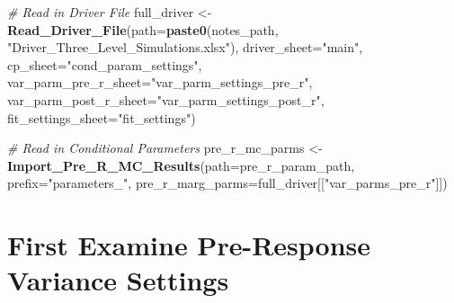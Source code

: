 \documentclass[
]{article}
\newenvironment{Shaded}{\begin{snugshade}}{\end{snugshade}}
\newcommand{\AttributeTok}[1]{\textcolor[rgb]{0.13,0.29,0.53}{#1}}
\newcommand{\CommentTok}[1]{\textcolor[rgb]{0.56,0.35,0.01}{\textit{#1}}}
\newcommand{\FunctionTok}[1]{\textcolor[rgb]{0.13,0.29,0.53}{\textbf{#1}}}
\newcommand{\NormalTok}[1]{#1}
\newcommand{\OtherTok}[1]{\textcolor[rgb]{0.56,0.35,0.01}{#1}}
\newcommand{\StringTok}[1]{\textcolor[rgb]{0.31,0.60,0.02}{#1}}
\begin{document}
\begin{Shaded}
\begin{Highlighting}[]
\CommentTok{\# Read in Driver File}
\NormalTok{full\_driver }\OtherTok{\textless{}{-}} \FunctionTok{Read\_Driver\_File}\NormalTok{(}\AttributeTok{path=}\FunctionTok{paste0}\NormalTok{(notes\_path, }\StringTok{"Driver\_Three\_Level\_Simulations.xlsx"}\NormalTok{), }
                                \AttributeTok{driver\_sheet=}\StringTok{"main"}\NormalTok{, }
                                \AttributeTok{cp\_sheet=}\StringTok{"cond\_param\_settings"}\NormalTok{,}
                                \AttributeTok{var\_parm\_pre\_r\_sheet=}\StringTok{"var\_parm\_settings\_pre\_r"}\NormalTok{,}
                                \AttributeTok{var\_parm\_post\_r\_sheet=}\StringTok{"var\_parm\_settings\_post\_r"}\NormalTok{,}
                                \AttributeTok{fit\_settings\_sheet=}\StringTok{"fit\_settings"}\NormalTok{)}

\CommentTok{\# Read in Conditional Parameters}
\NormalTok{pre\_r\_mc\_parms }\OtherTok{\textless{}{-}} \FunctionTok{Import\_Pre\_R\_MC\_Results}\NormalTok{(}\AttributeTok{path=}\NormalTok{pre\_r\_param\_path, }
                                          \AttributeTok{prefix=}\StringTok{"parameters\_"}\NormalTok{, }
                                          \AttributeTok{pre\_r\_marg\_parms=}\NormalTok{full\_driver[[}\StringTok{"var\_parms\_pre\_r"}\NormalTok{]])}
\end{Highlighting}
\end{Shaded}

\section{First Examine Pre-Response Variance
Settings}\label{first-examine-pre-response-variance-settings}
\end{document}
